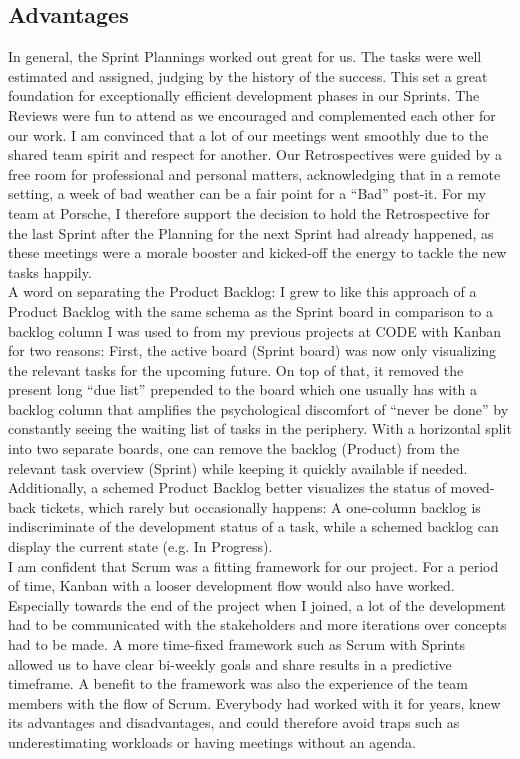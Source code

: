 \documentclass[a4paper]{article}
\begin{document}
\subsection{Advantages}
\label{sec:advantages}
In general, the Sprint Plannings worked out great for us. 
The tasks were well estimated and assigned, judging by the history of the success. 
This set a great foundation for exceptionally efficient development phases in our Sprints. 
The Reviews were fun to attend as we encouraged and complemented each other for our work. 
I am convinced that a lot of our meetings went smoothly due to the shared team spirit and respect for another. 
Our Retrospectives were guided by a free room for professional and personal matters, acknowledging that in a remote setting, a week of bad weather can be a fair point for a “Bad” post-it. 
For my team at Porsche, I therefore support the decision to hold the Retrospective for the last Sprint after the Planning for the next Sprint had already happened, as these meetings were a morale booster and kicked-off the energy to tackle the new tasks happily.
\\\linebreak
A word on separating the Product Backlog: I grew to like this approach of a Product Backlog with the same schema as the Sprint board in comparison to a backlog column I was used to from my previous projects at CODE with Kanban for two reasons: 
First, the active board (Sprint board) was now only visualizing the relevant tasks for the upcoming future. 
On top of that, it removed the present long “due list” prepended to the board which one usually has with a backlog column that amplifies the psychological discomfort of “never be done” by constantly seeing the waiting list of tasks in the periphery. 
With a horizontal split into two separate boards, one can remove the backlog (Product) from the relevant task overview (Sprint) while keeping it quickly available if needed.
Additionally, a schemed Product Backlog better visualizes the status of moved-back tickets, which rarely but occasionally happens: A one-column backlog is indiscriminate of the development status of a task, while a schemed backlog can display the current state (e.g. In Progress).
\\\linebreak
I am confident that Scrum was a fitting framework for our project. 
For a period of time, Kanban with a looser development flow would also have worked. 
Especially towards the end of the project when I joined, a lot of the development had to be communicated with the stakeholders and more iterations over concepts had to be made. 
A more time-fixed framework such as Scrum with Sprints allowed us to have clear bi-weekly goals and share results in a predictive timeframe. 
A benefit to the framework was also the experience of the team members with the flow of Scrum. 
Everybody had worked with it for years, knew its advantages and disadvantages, and could therefore avoid traps such as underestimating workloads or having meetings without an agenda.
\end{document}
